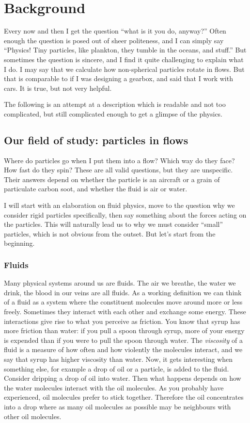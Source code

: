 \documentclass[thesis.tex]{subfiles}
\begin{document}
\chapter{Background}\label{sec:background}

Every now and then I get the question ``what is it you do, anyway?'' Often enough the question is posed out of sheer politeness, and I can simply say ``Physics! Tiny particles, like plankton, they tumble in the oceans, and stuff.'' But sometimes the question is sincere, and I find it quite challenging to explain what I do. I may say that we calculate how non-spherical particles rotate in flows. But that is comparable to if I was designing a gearbox, and said that I work with cars. It is true, but not very helpful. 

The following is an attempt at a description which is readable and not too complicated, but still complicated enough to get a glimpse of the physics.

\section{Our field of study: particles in flows}\label{sec:context}

Where do particles go when I put them into a flow? Which way do they face? How fast do they spin? These are all valid questions, but they are unspecific. Their answers depend on whether the particle is an aircraft or a grain of particulate carbon soot, and whether the fluid is air or water.

I will start with an elaboration on fluid physics, move to the question why we consider rigid particles specifically, then say something about the forces acting on the particles. This will naturally lead us to why we must consider ``small'' particles, which is not obvious from the outset. But let's start from the beginning.

\subsection*{Fluids}

Many physical systems around us are fluids. The air we breathe, the water we drink, the blood in our veins are all fluids. As a working definition we can think of a fluid as a system where the constituent molecules move around more or less freely. Sometimes they interact with each other and exchange some energy. These interactions give rise to what you perceive as friction. You know that syrup has more friction than water: if you pull a spoon through syrup, more of your energy is expended than if you were to pull the spoon through water. The \emph{viscosity} of a fluid is a measure of how often and how violently the molecules interact, and we say that syrup has higher viscosity than water. Now, it gets interesting when something else, for example a drop of oil or a particle, is added to the fluid. Consider dripping a drop of oil into water. Then what happens depends on how the water molecules interact with the oil molecules. As you probably have experienced, oil molecules prefer to stick together. Therefore the oil concentrates into a drop where as many oil molecules as possible may be neighbours with other oil molecules.
\end{document}
